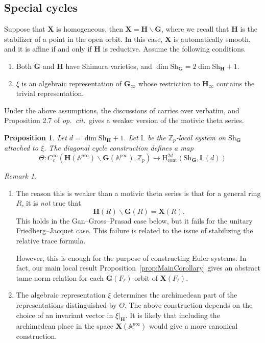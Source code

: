 \documentclass{amsart}
\newtheorem{prop}[theorem]{Proposition}
\theoremstyle{definition}
\theoremstyle{remark}
\newtheorem{remark}[theorem]{Remark}
\newcommand{\1}{\mathbf{1}}
\newcommand{\A}{\mathbb{A}}
\newcommand{\cont}{\mathrm{cont}}
\newcommand{\h}{\mathrm{H}}
\newcommand{\mb}[1]{\mathbf{#1}}
\newcommand{\Z}{\mathbb{Z}}
\theoremstyle{definition}
\newcommand{\bG}{\mathbf{G}}
\newcommand{\Sh}{\mathrm{Sh}}
\begin{document}
\subsection{Special cycles}\label{ss:Diagonal}
Suppose that $\mb{X}$ is homogeneous, then $\mb{X}=\mb{H}\backslash\bG$, where we recall that $\mb{H}$ is the stabilizer of a point in the open orbit. In this case, $\mb{X}$ is automatically smooth, and it is affine if and only if $\mb{H}$ is reductive. Assume the following conditions.
\begin{enumerate}
  \item Both $\mb{G}$ and $\mb{H}$ have Shimura varieties, and $\dim\Sh_{\bG}=2\dim\Sh_{\mb{H}}+1$.
  \item $\xi$ is an algebraic representation of $\mb{G}_\infty$ whose restriction to $\mb{H}_\infty$ contains the trivial representation.
\end{enumerate}
Under the above assumptions, the discussions of \cite[\S 2.4]{LaiSkinner} carries over verbatim, and Proposition 2.7 of \emph{op.~cit.}~gives a weaker version of the motivic theta series.
\begin{prop}\label{prop:cycle}
  Let $d=\dim\Sh_{\mb{H}}+1$. Let $\mathbb{L}$ be the $\Z_p$-local system on $\Sh_{\bG}$ attached to $\xi$. The diagonal cycle construction defines a map
  \[
    \Theta:C_c^\infty(\mb{H}(\A^{p\infty})\backslash\mb{G}(\A^{p\infty}),\Z_p)\to\h_\cont^{2d}(\Sh_{\bG},\mathbb{L}(d))
  \]
\end{prop}

\begin{remark}
  \begin{enumerate}
    \item The reason this is weaker than a motivic theta series is that for a general ring $R$, it is \emph{not} true that
    \[
      \mb{H}(R)\backslash\mb{G}(R)=\mb{X}(R).
    \]
    This holds in the Gan--Gross--Prasad case below, but it fails for the unitary Friedberg--Jacquet case. This failure is related to the issue of stabilizing the relative trace formula.
    
    However, this is enough for the purpose of constructing Euler systems. In fact, our main local result Proposition~\ref{prop:MainCorollary} gives an abstract tame norm relation for each $\bG(F_\ell)$-orbit of $\mb{X}(F_\ell)$.
    \item The algebraic representation $\xi$ determines the archimedean part of the representations distinguished by $\Theta$. The above construction depends on the choice of an invariant vector in $\xi|_{\mb{H}}$. It is likely that including the archimedean place in the space $\mb{X}(\A^{p\infty})$ would give a more canonical construction.
  \end{enumerate}
\end{remark}
\end{document}
